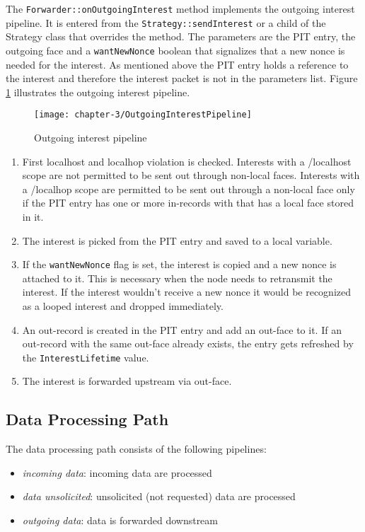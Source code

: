 The \texttt{Forwarder::onOutgoingInterest} method implements the outgoing interest pipeline. It is entered from the \texttt{Strategy::sendInterest} or a child of the Strategy class that overrides the method. The parameters are the PIT entry, the outgoing face and a \texttt{wantNewNonce} boolean that signalizes that a new nonce is needed for the interest. As mentioned above the PIT entry holds a reference to the interest and therefore the interest packet is not in the parameters list. Figure \ref{fig:OutgoingInterestPipeline} illustrates the outgoing interest pipeline.

\begin{figure}[H]
  \centering
  \texttt{[image: chapter-3/OutgoingInterestPipeline]}
  \caption{Outgoing interest pipeline \cite{Afanasyev16}}
  \label{fig:OutgoingInterestPipeline}
\end{figure}

\begin{enumerate}
\item First localhost and localhop violation is checked. Interests with a /localhost scope are not permitted to be sent out through non-local faces. Interests with a /localhop scope are permitted to be sent out through a non-local face only if the PIT entry has one or more in-records with that has a local face stored in it.
\item The interest is picked from the PIT entry and saved to a local variable.
\item If the \texttt{wantNewNonce} flag is set, the interest is copied and a new nonce is attached to it. This is necessary when the node needs to retransmit the interest. If the interest wouldn't receive a new nonce it would be recognized as a looped interest and dropped immediately.
\item An out-record is created in the PIT entry and add an out-face to it. If an out-record with the same out-face already exists, the entry gets refreshed by the \texttt{InterestLifetime} value.
\item The interest is forwarded upstream via out-face.
\end{enumerate}

\subsection{Data Processing Path}

The data processing path consists of the following pipelines:

\begin{itemize}
\item \emph{incoming data}: incoming data are processed
\item \emph{data unsolicited}: unsolicited (not requested) data are processed
\item \emph{outgoing data}: data is forwarded downstream
\end{itemize}


